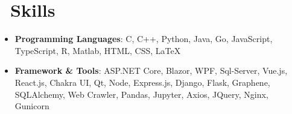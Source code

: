\documentclass{resume}
\begin{document}
\section{\texorpdfstring{\faCogs}{}\ Skills}
\begin{itemize}[parsep=0.5ex]
  \item \textbf{Programming Languages}: C, C++, Python, Java, Go, JavaScript, TypeScript, R, Matlab, HTML, CSS, \LaTeX
  \item \textbf{Framework \& Tools}: ASP.NET Core, Blazor, WPF, Sql-Server, Vue.js, React.js, Chakra UI, Qt, Node, Express.js, Django, Flask, Graphene, SQLAlchemy, Web Crawler, Pandas, Jupyter, Axios, JQuery, Nginx, Gunicorn
\end{itemize}



%
%
\end{document}
